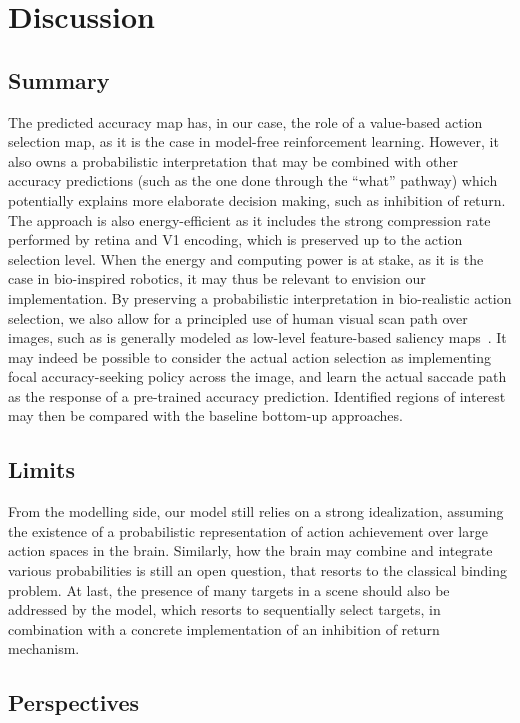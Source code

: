 \section{Discussion}
\label{sec:discussion}
\ICANN
\else

\subsection{Summary}
\fi
The predicted accuracy map has, in our case, the role of a value-based action selection map, as it is the case in model-free reinforcement learning. However, it also owns a probabilistic interpretation that may be combined with other accuracy predictions (such as the one done through the ``what'' pathway) which potentially explains more elaborate decision making, such as inhibition of return. The approach is also energy-efficient as it includes the strong compression rate performed by retina and V1 encoding, which is preserved up to the action selection level. When the energy and computing power is at stake, as it is the case in bio-inspired robotics, it may thus be relevant to envision our implementation. By preserving a probabilistic interpretation in bio-realistic action selection, we also allow for a principled use of human visual scan path over images, such as is generally modeled as low-level feature-based saliency maps~\citep{Itti01}. It may indeed be possible to consider the actual action selection as implementing focal accuracy-seeking policy across the image, and learn the actual saccade path as the response of a pre-trained accuracy prediction. Identified regions of interest may then be compared with the baseline bottom-up approaches.

\ICANN
\else
\subsection{Limits}
\fi


From the modelling side, our model still relies on a strong idealization, assuming the existence of a probabilistic representation of action achievement over large action spaces in the brain. Similarly, how the brain may combine and integrate various probabilities is still an open question, that resorts to the classical binding problem. %
At last, the presence of many targets in a scene should also be addressed by the model, which resorts to sequentially select targets, in combination with a concrete implementation of an inhibition of return mechanism.
\ICANN
\else


\subsection{Perspectives}
\fi